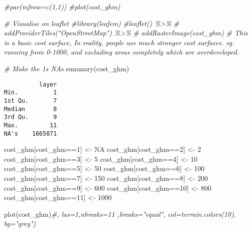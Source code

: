 \documentclass[
]{book}
\newenvironment{Shaded}{\begin{snugshade}}{\end{snugshade}}
\newcommand{\CommentTok}[1]{\textcolor[rgb]{0.56,0.35,0.01}{\textit{#1}}}
\newcommand{\ConstantTok}[1]{\textcolor[rgb]{0.00,0.00,0.00}{#1}}
\newcommand{\DecValTok}[1]{\textcolor[rgb]{0.00,0.00,0.81}{#1}}
\newcommand{\FunctionTok}[1]{\textcolor[rgb]{0.00,0.00,0.00}{#1}}
\newcommand{\NormalTok}[1]{#1}
\newcommand{\OtherTok}[1]{\textcolor[rgb]{0.56,0.35,0.01}{#1}}
\newcommand{\SpecialCharTok}[1]{\textcolor[rgb]{0.00,0.00,0.00}{#1}}
\begin{document}
\begin{Shaded}
\begin{Highlighting}[]
\CommentTok{\#par(mfrow=c(1,1))}
\CommentTok{\#plot(cost\_ghm)}

\CommentTok{\# Visualise on leaflet}
\CommentTok{\#library(leafem)}
\CommentTok{\#leaflet() \%\textgreater{}\%}
\CommentTok{\#  addProviderTiles("OpenStreetMap") \%\textgreater{}\%}
\CommentTok{\#  addRasterImage(cost\_ghm)}
\CommentTok{\# This is a basic cost surface, In reality, people use much stronger cost surfaces. eg. running from 0{-}1000, and excluding areas completely which are overdeveloped. }


\CommentTok{\# Make the 1\textquotesingle{}s NA\textquotesingle{}s}
\FunctionTok{summary}\NormalTok{(cost\_ghm)}
\end{Highlighting}
\end{Shaded}

\begin{verbatim}
          layer
Min.          1
1st Qu.       7
Median        8
3rd Qu.       9
Max.         11
NA's    1665071
\end{verbatim}

\begin{Shaded}
\begin{Highlighting}[]
\NormalTok{cost\_ghm[cost\_ghm}\SpecialCharTok{==}\DecValTok{1}\NormalTok{] }\OtherTok{\textless{}{-}} \ConstantTok{NA}
\NormalTok{cost\_ghm[cost\_ghm}\SpecialCharTok{==}\DecValTok{2}\NormalTok{] }\OtherTok{\textless{}{-}} \DecValTok{2}
\NormalTok{cost\_ghm[cost\_ghm}\SpecialCharTok{==}\DecValTok{3}\NormalTok{] }\OtherTok{\textless{}{-}} \DecValTok{5}
\NormalTok{cost\_ghm[cost\_ghm}\SpecialCharTok{==}\DecValTok{4}\NormalTok{] }\OtherTok{\textless{}{-}} \DecValTok{10}
\NormalTok{cost\_ghm[cost\_ghm}\SpecialCharTok{==}\DecValTok{5}\NormalTok{] }\OtherTok{\textless{}{-}} \DecValTok{50}
\NormalTok{cost\_ghm[cost\_ghm}\SpecialCharTok{==}\DecValTok{6}\NormalTok{] }\OtherTok{\textless{}{-}} \DecValTok{100}
\NormalTok{cost\_ghm[cost\_ghm}\SpecialCharTok{==}\DecValTok{7}\NormalTok{] }\OtherTok{\textless{}{-}} \DecValTok{150}
\NormalTok{cost\_ghm[cost\_ghm}\SpecialCharTok{==}\DecValTok{8}\NormalTok{] }\OtherTok{\textless{}{-}} \DecValTok{200}
\NormalTok{cost\_ghm[cost\_ghm}\SpecialCharTok{==}\DecValTok{9}\NormalTok{] }\OtherTok{\textless{}{-}} \DecValTok{600}
\NormalTok{cost\_ghm[cost\_ghm}\SpecialCharTok{==}\DecValTok{10}\NormalTok{] }\OtherTok{\textless{}{-}} \DecValTok{800}
\NormalTok{cost\_ghm[cost\_ghm}\SpecialCharTok{==}\DecValTok{11}\NormalTok{] }\OtherTok{\textless{}{-}} \DecValTok{1000}

\FunctionTok{plot}\NormalTok{(cost\_ghm)}\CommentTok{\#, las=1,nbreaks=11 ,breaks="equal", col=terrain.colors(10), bg="grey")}
\end{Highlighting}
\end{Shaded}
\end{document}
